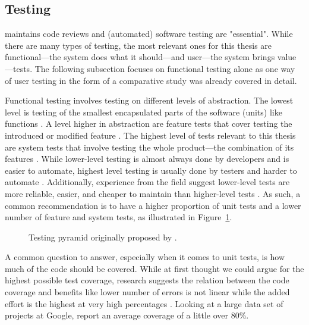 \subsection{Testing}
\label{Literature-Software-Testing}

\textcite[Chapter~9]{Sommerville_2019} maintains code reviews and (automated) software testing are "essential".
While there are many types of testing, the most relevant ones for this thesis are functional---the system does what it should---and user---the system brings value---tests.
The following subsection focuses on functional testing alone as one way of user testing in the form of a comparative study was already covered in detail.

Functional testing involves testing on different levels of abstraction.
The lowest level is testing of the smallest encapsulated parts of the software (units) like functions \parencite[Chapter~9]{Sommerville_2019}.
A level higher in abstraction are feature tests that cover testing the introduced or modified feature \parencite[Chapter~9]{Sommerville_2019}.
The highest level of tests relevant to this thesis are system tests that involve testing the whole product---the combination of its features \parencite[Chapter~9]{Sommerville_2019}.
While lower-level testing is almost always done by developers and is easier to automate, highest level testing is usually done by testers and harder to automate \parencite[Chapter~9]{Sommerville_2019}.
Additionally, experience from the field suggest lower-level tests are more reliable, easier, and cheaper to maintain than higher-level tests \parencites{cohn_succeeding_2010}{Wacker_2015}{Sommerville_2019}.
As such, a common recommendation is to have a higher proportion of unit tests and a lower number of feature and system tests, as illustrated in Figure~\ref{fig:testing-pyramid}.

\begin{figure}[H]
    \centering
    
    \caption{Testing pyramid originally proposed by \textcite{cohn_succeeding_2010}.}
    \label{fig:testing-pyramid}
\end{figure}

A common question to answer, especially when it comes to unit tests, is how much of the code should be covered.
While at first thought we could argue for the highest possible test coverage, research suggests the relation between the code coverage and benefits like lower number of errors is not linear while the added effort is the highest at very high percentages \parencite{Antinyan2018}.
Looking at a large data set of projects at Google, \textcite{Ivankovic_2019} report an average coverage of a little over 80\%.
